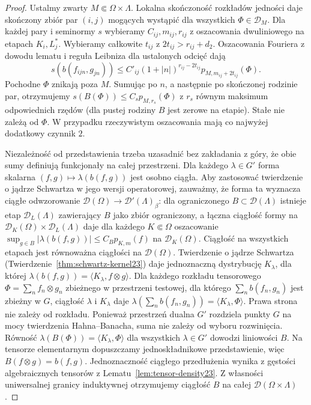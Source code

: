 \begin{proof}
Ustalmy zwarty $M\Subset\Omega\times\Lambda$.
Lokalna skończoność rozkładów jedności daje
skończony zbiór par $(i,j)$ mogących wystąpić
dla wszystkich $\Phi\in\mathcal D_M$.
Dla każdej pary i seminormy $s$ wybieramy
$C_{ij},m_{ij},r_{ij}$ z oszacowania dwuliniowego
na etapach $K_i,L_j^*$. Wybieramy całkowite
$t_{ij}$ z $2t_{ij}>r_{ij}+d_2$.
Oszacowania Fouriera z dowodu lematu i reguła
Leibniza dla ustalonych odcięć dają
\[
 s(b(f_{ijn},g_{jn}))\le C'_{ij}
 (1+|n|)^{r_{ij}-2t_{ij}}
 p_{M,m_{ij}+2t_{ij}}(\Phi).
\]
Pochodne $\Phi$ znikają poza $M$.
Sumując po $n$, a następnie po skończonej rodzinie
par, otrzymujemy $s(B(\Phi))\le C_s p_{M,r_s}(\Phi)$
z $r_s$ równym maksimum odpowiednich rzędów
(dla pustej rodziny $B$ jest zerowe na etapie).
Stałe nie zależą od $\Phi$. W przypadku rzeczywistym
oszacowania mają co najwyżej dodatkowy czynnik $2$.

Niezależność od przedstawienia trzeba uzasadnić bez
zakładania z góry, że obie sumy definiują funkcjonały
na całej przestrzeni. Dla każdego $\lambda\in G'$ forma
skalarna $(f,g)\mapsto\lambda(b(f,g))$ jest osobno ciągła.
Aby zastosować twierdzenie o jądrze Schwartza w jego
wersji operatorowej, zauważmy, że forma ta wyznacza
ciągłe odwzorowanie $\mathcal D(\Omega)\to
\mathcal D'(\Lambda)_\beta$: dla ograniczonego
$B\subset\mathcal D(\Lambda)$ istnieje etap
$\mathcal D_L(\Lambda)$ zawierający $B$ jako zbiór
ograniczony, a łączna ciągłość formy na
$\mathcal D_K(\Omega)\times\mathcal D_L(\Lambda)$
daje dla każdego $K\Subset\Omega$ oszacowanie
$\sup_{g\in B}|\lambda(b(f,g))|\le C_B p_{K,m}(f)$
na $\mathcal D_K(\Omega)$. Ciągłość na wszystkich
etapach jest równoważna ciągłości na $\mathcal D(\Omega)$.
Twierdzenie o jądrze Schwartza
(Twierdzenie~\ref{thm:schwartz-kernel23}) daje
jednoznaczną dystrybucję $K_\lambda$, dla której
$\lambda(b(f,g))=\langle K_\lambda,f\otimes g\rangle$.
Dla każdego rozkładu tensorowego
$\Phi=\sum_n f_n\otimes g_n$ zbieżnego w przestrzeni
testowej, dla którego $\sum_n b(f_n,g_n)$ jest
zbieżny w $G$, ciągłość $\lambda$ i $K_\lambda$ daje
$\lambda(\sum_n b(f_n,g_n))=\langle K_\lambda,\Phi\rangle$.
Prawa strona nie zależy od rozkładu. Ponieważ przestrzeń dualna $G'$ rozdziela punkty
$G$ na mocy twierdzenia Hahna--Banacha, suma nie zależy
od wyboru rozwinięcia. Równość
$\lambda(B(\Phi))=\langle K_\lambda,\Phi\rangle$
dla wszystkich $\lambda\in G'$ dowodzi liniowości $B$.
Na tensorze elementarnym dopuszczamy jednoskładnikowe
przedstawienie, więc $B(f\otimes g)=b(f,g)$.
Jednoznaczność ciągłego przedłużenia wynika z gęstości
algebraicznych tensorów z Lematu~\ref{lem:tensor-density23}.
Z własności uniwersalnej granicy induktywnej otrzymujemy
ciągłość $B$ na całej $\mathcal D(\Omega\times\Lambda)$.


\end{proof}
